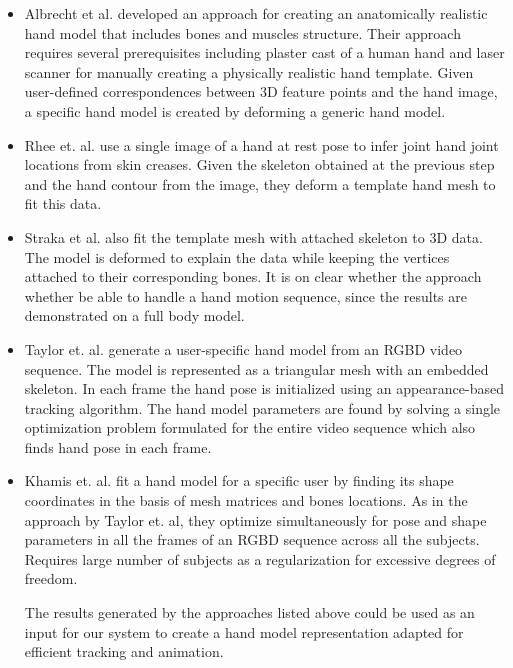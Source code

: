 \begin{itemize}

\item Albrecht et al. \cite{albrecht2003construction} developed an approach for creating an anatomically realistic hand model that includes bones and muscles structure. Their approach requires several prerequisites including plaster cast of a human hand and laser scanner for manually creating a physically realistic hand template. Given user-defined correspondences between 3D feature points and the hand image, a specific hand model is created by deforming a generic hand model. 

\item Rhee et. al. \cite{rhee2006human} use a single image of a hand at rest pose to infer joint hand joint locations from skin creases. Given the skeleton obtained at the previous step and the hand contour from the image, they deform a template hand mesh to fit this data. 

\item Straka et al. \cite{straka2012simultaneous} also fit the template mesh with attached skeleton to 3D data. The model is deformed to explain the data while keeping the vertices attached to their corresponding bones. It is on clear whether the approach whether be able to handle a hand motion sequence, since the results are demonstrated on a full body model.

\item Taylor et. al. \cite{taylor2014user} generate a user-specific hand model from an RGBD video sequence. The model is represented as a triangular mesh with an embedded skeleton. In each frame the hand pose is initialized using an appearance-based tracking algorithm. The hand model parameters are found by solving a single optimization problem formulated for the entire video sequence which also finds hand pose in each frame. 

\item Khamis et. al.  \cite{khamis12learning} fit a hand model for a specific user by finding its shape coordinates in the basis of mesh matrices and bones locations. As in the approach by Taylor et. al, they optimize simultaneously for pose and shape parameters in all the frames of an RGBD sequence across all the subjects. Requires large number of subjects as a regularization for excessive degrees of freedom. 

The results generated by the approaches listed above could be used as an input for our system to create a hand model representation adapted for efficient tracking and animation.







\end{itemize}